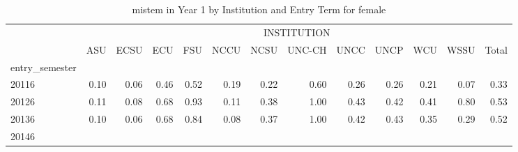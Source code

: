 \begin{table}[!h]
\caption{mistem in Year 1 by Institution and Entry Term for female}
\centering
\begin{tabular}{lllllllllllll}
\cline{1-13}
\multicolumn{1}{c}{} &
  \multicolumn{12}{|c}{INSTITUTION} \\
\multicolumn{1}{c}{} &
  \multicolumn{1}{|r}{ASU} &
  \multicolumn{1}{r}{ECSU} &
  \multicolumn{1}{r}{ECU} &
  \multicolumn{1}{r}{FSU} &
  \multicolumn{1}{r}{NCCU} &
  \multicolumn{1}{r}{NCSU} &
  \multicolumn{1}{r}{UNC-CH} &
  \multicolumn{1}{r}{UNCC} &
  \multicolumn{1}{r}{UNCP} &
  \multicolumn{1}{r}{WCU} &
  \multicolumn{1}{r}{WSSU} &
  \multicolumn{1}{r}{Total} \\
\cline{1-13}
\multicolumn{1}{l}{entry\_semester} &
  \multicolumn{1}{|r}{} &
  \multicolumn{1}{r}{} &
  \multicolumn{1}{r}{} &
  \multicolumn{1}{r}{} &
  \multicolumn{1}{r}{} &
  \multicolumn{1}{r}{} &
  \multicolumn{1}{r}{} &
  \multicolumn{1}{r}{} &
  \multicolumn{1}{r}{} &
  \multicolumn{1}{r}{} &
  \multicolumn{1}{r}{} &
  \multicolumn{1}{r}{} \\
\multicolumn{1}{l}{\hspace{1em}20116} &
  \multicolumn{1}{|r}{0.10} &
  \multicolumn{1}{r}{0.06} &
  \multicolumn{1}{r}{0.46} &
  \multicolumn{1}{r}{0.52} &
  \multicolumn{1}{r}{0.19} &
  \multicolumn{1}{r}{0.22} &
  \multicolumn{1}{r}{0.60} &
  \multicolumn{1}{r}{0.26} &
  \multicolumn{1}{r}{0.26} &
  \multicolumn{1}{r}{0.21} &
  \multicolumn{1}{r}{0.07} &
  \multicolumn{1}{r}{0.33} \\
\multicolumn{1}{l}{\hspace{1em}20126} &
  \multicolumn{1}{|r}{0.11} &
  \multicolumn{1}{r}{0.08} &
  \multicolumn{1}{r}{0.68} &
  \multicolumn{1}{r}{0.93} &
  \multicolumn{1}{r}{0.11} &
  \multicolumn{1}{r}{0.38} &
  \multicolumn{1}{r}{1.00} &
  \multicolumn{1}{r}{0.43} &
  \multicolumn{1}{r}{0.42} &
  \multicolumn{1}{r}{0.41} &
  \multicolumn{1}{r}{0.80} &
  \multicolumn{1}{r}{0.53} \\
\multicolumn{1}{l}{\hspace{1em}20136} &
  \multicolumn{1}{|r}{0.10} &
  \multicolumn{1}{r}{0.06} &
  \multicolumn{1}{r}{0.68} &
  \multicolumn{1}{r}{0.84} &
  \multicolumn{1}{r}{0.08} &
  \multicolumn{1}{r}{0.37} &
  \multicolumn{1}{r}{1.00} &
  \multicolumn{1}{r}{0.42} &
  \multicolumn{1}{r}{0.43} &
  \multicolumn{1}{r}{0.35} &
  \multicolumn{1}{r}{0.29} &
  \multicolumn{1}{r}{0.52} \\
\multicolumn{1}{l}{\hspace{1em}20146} &

\end{tabular}
\end{table}

